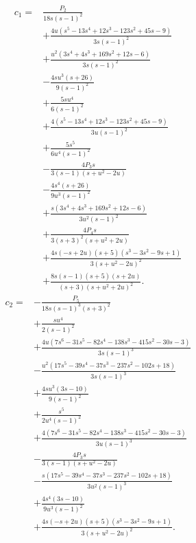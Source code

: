 \begin{align}
c_{1}={}&\frac{P_{2}}{18 s \left(s - 1\right)^{2}}\\
&+\frac{4 u \left(s^{5} - 13 s^{4} + 12 s^{3} - 123 s^{2} + 45 s - 9\right)}{3 s \left(s - 1\right)^{2}}\\
&+\frac{u^{2} \left(3 s^{4} + 4 s^{3} + 169 s^{2} + 12 s - 6\right)}{3 s \left(s - 1\right)^{2}}\\
&- \frac{4 s u^{3} \left(s + 26\right)}{9 \left(s - 1\right)^{2}}\\
&+\frac{5 s u^{4}}{6 \left(s - 1\right)^{2}}\\
&+\frac{4 \left(s^{5} - 13 s^{4} + 12 s^{3} - 123 s^{2} + 45 s - 9\right)}{3 u \left(s - 1\right)^{2}}\\
&+\frac{5 s^{5}}{6 u^{4} \left(s - 1\right)^{2}}\\
&- \frac{4 P_{3} s}{3 \left(s - 1\right) \left(s + u^{2} - 2 u\right)}\\
&- \frac{4 s^{4} \left(s + 26\right)}{9 u^{3} \left(s - 1\right)^{2}}\\
&+\frac{s \left(3 s^{4} + 4 s^{3} + 169 s^{2} + 12 s - 6\right)}{3 u^{2} \left(s - 1\right)^{2}}\\
&+\frac{4 P_{4} s}{3 \left(s + 3\right)^{2} \left(s + u^{2} + 2 u\right)}\\
&+\frac{4 s \left(- s + 2 u\right) \left(s + 5\right) \left(s^{3} - 3 s^{2} - 9 s + 1\right)}{3 \left(s + u^{2} - 2 u\right)^{2}}\\
&+\frac{8 s \left(s - 1\right) \left(s + 5\right) \left(s + 2 u\right)}{\left(s + 3\right) \left(s + u^{2} + 2 u\right)^{2}}.
\end{align}
\begin{align}
c_{2}={}&- \frac{P_{5}}{18 s \left(s - 1\right)^{3} \left(s + 3\right)^{2}}\\
&+\frac{s u^{4}}{2 \left(s - 1\right)^{2}}\\
&+\frac{4 u \left(7 s^{6} - 31 s^{5} - 82 s^{4} - 138 s^{3} - 415 s^{2} - 30 s - 3\right)}{3 s \left(s - 1\right)^{3}}\\
&- \frac{u^{2} \left(17 s^{5} - 39 s^{4} - 37 s^{3} - 237 s^{2} - 102 s + 18\right)}{3 s \left(s - 1\right)^{3}}\\
&+\frac{4 s u^{3} \left(3 s - 10\right)}{9 \left(s - 1\right)^{2}}\\
&+\frac{s^{5}}{2 u^{4} \left(s - 1\right)^{2}}\\
&+\frac{4 \left(7 s^{6} - 31 s^{5} - 82 s^{4} - 138 s^{3} - 415 s^{2} - 30 s - 3\right)}{3 u \left(s - 1\right)^{3}}\\
&- \frac{4 P_{3} s}{3 \left(s - 1\right) \left(s + u^{2} - 2 u\right)}\\
&- \frac{s \left(17 s^{5} - 39 s^{4} - 37 s^{3} - 237 s^{2} - 102 s + 18\right)}{3 u^{2} \left(s - 1\right)^{3}}\\
&+\frac{4 s^{4} \left(3 s - 10\right)}{9 u^{3} \left(s - 1\right)^{2}}\\
&+\frac{4 s \left(- s + 2 u\right) \left(s + 5\right) \left(s^{3} - 3 s^{2} - 9 s + 1\right)}{3 \left(s + u^{2} - 2 u\right)^{2}}.
\end{align}
